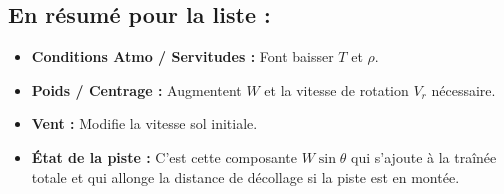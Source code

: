 			
		
		
			\subsection{En résumé pour la liste :}
			
			\begin{itemize}
				\item \textbf{Conditions Atmo / Servitudes :} Font baisser $T$ et $\rho$.
				\item \textbf{Poids / Centrage :} Augmentent $W$ et la vitesse de rotation $V_r$ nécessaire.
				\item \textbf{Vent :} Modifie la vitesse sol initiale.
				\item \textbf{État de la piste :} C'est cette composante $W \sin \theta$ qui s'ajoute à la traînée totale et qui allonge la distance de décollage si la piste est en montée.\\
				
			\end{itemize}
		
		
	
	
	
	
	
	
	
	
	
	
	
	
	
	
	
	
	
	






